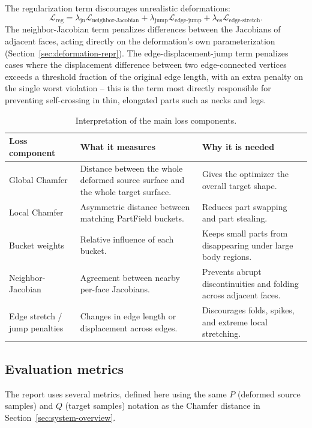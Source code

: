 \documentclass{article}
\begin{document}
The regularization term discourages unrealistic deformations:
\[
\mathcal{L}_{\mathrm{reg}} = \lambda_{\mathrm{jn}}\mathcal{L}_{\mathrm{neighbor\text{-}Jacobian}}
+ \lambda_{\mathrm{jump}}\mathcal{L}_{\mathrm{edge\text{-}jump}}
+ \lambda_{\mathrm{es}}\mathcal{L}_{\mathrm{edge\text{-}stretch}}.
\]
The neighbor-Jacobian term penalizes differences between the Jacobians of adjacent faces, acting
directly on the deformation's own parameterization (Section~\ref{sec:deformation-repr}). The
edge-displacement-jump term penalizes cases where the displacement difference between two
edge-connected vertices exceeds a threshold fraction of the original edge length, with an extra
penalty on the single worst violation -- this is the term most directly responsible for preventing
self-crossing in thin, elongated parts such as necks and legs.

\begin{table}[H]
\centering
\small
\begin{tabularx}{\textwidth}{lXX}
\toprule
Loss component & What it measures & Why it is needed \\
\midrule
Global Chamfer & Distance between the whole deformed source surface and the whole target surface. & Gives the optimizer the overall target shape. \\
Local Chamfer & Asymmetric distance between matching PartField buckets. & Reduces part swapping and part stealing. \\
Bucket weights & Relative influence of each bucket. & Keeps small parts from disappearing under large body regions. \\
Neighbor-Jacobian & Agreement between nearby per-face Jacobians. & Prevents abrupt discontinuities and folding across adjacent faces. \\
Edge stretch / jump penalties & Changes in edge length or displacement across edges. & Discourages folds, spikes, and extreme local stretching. \\
\bottomrule
\end{tabularx}
\caption{Interpretation of the main loss components.}
\label{tab:loss-components}
\end{table}

\subsection{Evaluation metrics}
\label{sec:evaluation}
\label{sec:eval-metrics}

The report uses several metrics, defined here using the same $P$ (deformed
source samples) and $Q$ (target samples) notation as the Chamfer distance in
Section~\ref{sec:system-overview}.
\end{document}
